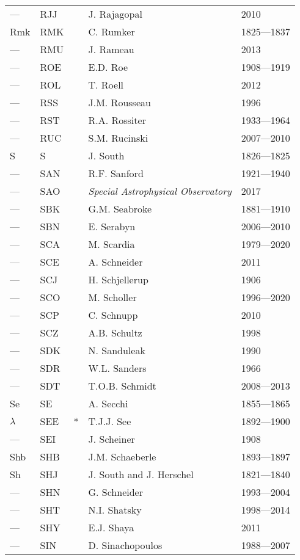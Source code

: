 \begin{longtable}{l|l|c|p{59mm}|l}
--- & RJJ &   & J. Rajagopal & 2010 \\
Rmk & RMK &   & C. Rumker & 1825---1837 \\
--- & RMU &   & J. Rameau & 2013 \\
--- & ROE &   & E.D. Roe & 1908---1919 \\
--- & ROL &   & T. Roell & 2012 \\
--- & RSS &   & J.M. Rousseau & 1996 \\
--- & RST &   & R.A. Rossiter & 1933---1964 \\
--- & RUC &   & S.M. Rucinski & 2007---2010 \\\midrule
S   & S   &   & J. South & 1826---1825 \\
--- & SAN &   & R.F. Sanford & 1921---1940 \\
--- & SAO &   & \emph{Special Astrophysical Observatory} & 2017 \\
--- & SBK &   & G.M. Seabroke & 1881---1910 \\
--- & SBN &   & E. Serabyn & 2006---2010 \\
--- & SCA &   & M. Scardia & 1979---2020 \\
--- & SCE &   & A. Schneider & 2011 \\
--- & SCJ &   & H. Schjellerup & 1906 \\
--- & SCO &   & M. Scholler & 1996---2020 \\
--- & SCP &   & C. Schnupp & 2010 \\
--- & SCZ &   & A.B. Schultz & 1998 \\
--- & SDK &   & N. Sanduleak & 1990 \\
--- & SDR &   & W.L. Sanders & 1966 \\
--- & SDT &   & T.O.B. Schmidt & 2008---2013 \\
Se  & SE  &   & A. Secchi & 1855---1865 \\
$\lambda$ & SEE & *  & T.J.J. See & 1892---1900 \\
--- & SEI &   & J. Scheiner & 1908 \\
Shb & SHB &   & J.M. Schaeberle & 1893---1897 \\
Sh  & SHJ &   & J. South and J. Herschel & 1821---1840 \\
--- & SHN &   & G. Schneider & 1993---2004 \\
--- & SHT &   & N.I. Shatsky & 1998---2014 \\
--- & SHY &   & E.J. Shaya & 2011 \\
--- & SIN &   & D. Sinachopoulos & 1988---2007 \\

\end{longtable}
